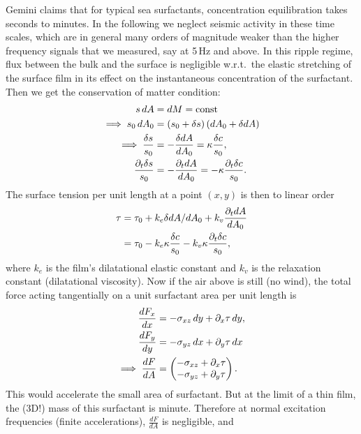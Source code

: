 \documentclass[reqno]{amsart}
\numberwithin{equation}{section}
\numberwithin{figure}{section}
\begin{document}
Gemini claims that for typical sea surfactants, concentration equilibration takes seconds to minutes. In the following we neglect seismic activity in these time scales, which are in general many orders of magnitude weaker than the higher frequency signals that we measured, say at 5\,Hz and above. In this ripple regime, flux between the bulk and the surface is negligible w.r.t.\ the elastic stretching of the surface film in its effect on the instantaneous concentration of the surfactant. Then we get the conservation of matter condition:
\begin{align*}
s\, dA &= dM = \text{const} \\
\implies s_{0}\, dA_{0}
  &= \left(s_{0}+\delta s\right)\left(dA_{0}+\delta dA\right) \\
\implies \frac{\delta s}{s_{0}}
  &= -\frac{\delta dA}{dA_{0}}=\kappa\frac{\delta c}{s_{0}}, \\
\frac{\partial_{t}\delta s}{s_{0}}
  &= -\frac{\partial_{t}dA}{dA_{0}}=-\kappa\frac{\partial_{t}\delta c}{s_{0}}.
\end{align*}
The surface tension per unit length at a point $\left(x,y\right)$ is then to linear order
\begin{align*}
\tau &= \tau_{0}+k_{e}\delta dA/dA_{0}+k_{v}\frac{\partial_{t}dA}{dA_{0}} \\
          &= \tau_{0}-k_{e}\kappa\frac{\delta c}{s_{0}}-k_{v}\kappa\frac{\partial_{t}\delta c}{s_{0}},
\end{align*}
where $k_{e}$ is the film's dilatational elastic constant and $k_{v}$ is the relaxation constant (dilatational viscosity). Now if the air above is still (no wind), the total force acting tangentially on a unit surfactant area per unit length is
\begin{align*}
\frac{dF_{x}}{dx} &= -\sigma_{xz}\,dy+\partial_{x}\tau\,dy, \\
\frac{dF_{y}}{dy} &= -\sigma_{yz}\,dx+\partial_{y}\tau\,dx \\
\implies \frac{dF}{dA}
  &= \begin{pmatrix}-\sigma_{xz}+\partial_{x}\tau\\
                    -\sigma_{yz}+\partial_{y}\tau
     \end{pmatrix}.
\end{align*}
This would accelerate the small area of surfactant. But at the limit of a thin film, the (3D!) mass of this surfactant is minute. Therefore at normal excitation frequencies (finite accelerations), $\frac{dF}{dA}$ is negligible, and
\end{document}
